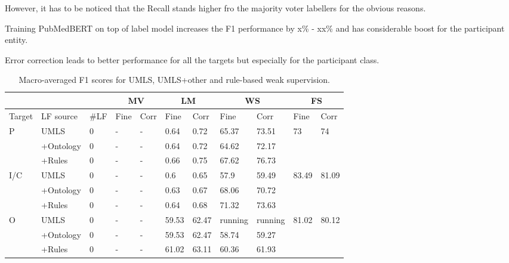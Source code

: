 \documentclass[10.7pt,]{article}
\begin{document}
However, it has to be noticed that the Recall stands higher fro the majority voter labellers for the obvious reasons.


Training PubMedBERT on top of label model increases the F1 performance by x\% - xx\% and has considerable boost for the participant entity.


Error correction leads to better performance for all the targets but especially for the participant class.



\begin{table}[!ht]
    \centering
    \begin{tabular}{|l|l|l|l|l|l|l|l|l|l|l|}
        \hline
        \multicolumn{3}{|c|}{} &
        \multicolumn{2}{|c|}{MV} & \multicolumn{2}{|c|}{LM} & \multicolumn{2}{|c|}{WS} & \multicolumn{2}{|c|}{FS} \\
        \hline
        Target & LF source & \#LF & Fine & Corr & Fine & Corr & Fine & Corr & Fine & Corr \\
        \hline
        P & UMLS & 0 & - & - & 0.64 & 0.72 & 65.37 & 73.51 & 73 & 74 \\ 
        ~ & +Ontology & 0 & - & - & 0.64 & 0.72 & 64.62 & 72.17 & ~ & ~ \\ 
        ~ & +Rules & 0 & - & - & 0.66 & 0.75 & 67.62 & 76.73 & ~ & ~ \\ 
        I/C & UMLS & 0 & - & - & 0.6 & 0.65 & 57.9 & 59.49 & 83.49 & 81.09 \\ 
        ~ & +Ontology & 0 & - & - & 0.63 & 0.67 & 68.06 & 70.72 & ~ & ~ \\ 
        ~ & +Rules & 0 & - & - & 0.64 & 0.68 & 71.32 & 73.63 & ~ & ~ \\ 
        O & UMLS & 0 & - & - & 59.53 & 62.47 & running & running & 81.02 & 80.12 \\ 
        ~ & +Ontology & 0 & - & - & 59.53 & 62.47 & 58.74 & 59.27 & ~ & ~ \\ 
        ~ & +Rules & 0 & - & - & 61.02 & 63.11 & 60.36 & 61.93 & ~ & ~ \\ \hline
    \end{tabular}
    \caption{\label{tab:res} Macro-averaged F1 scores for UMLS, UMLS+other and rule-based weak supervision.}
\end{table}
\end{document}
